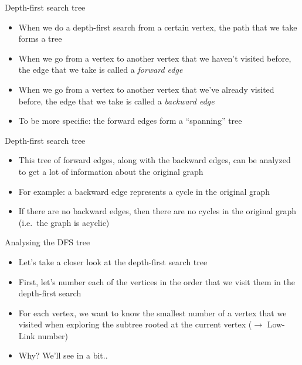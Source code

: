 \documentclass[12pt,t]{beamer}
\newcommand{\bi}{\begin{itemize}}
\newcommand{\ei}{\end{itemize}}
\begin{document}
\begin{frame}{Depth-first search tree}
    \vspace{30pt}

    \bi
        \item When we do a depth-first search from a certain vertex, the path
            that we take forms a tree
        \item When we go from a vertex to another vertex that we haven't visited before, the edge that we take is called a \textit{forward edge}
        \item When we go from a vertex to another vertex that we've already visited before, the edge that we take is called a \textit{backward edge}
        \item To be more specific: the forward edges form a ``spanning'' tree
    \ei
\end{frame}

\begin{frame}{Depth-first search tree}
    \vspace{30pt}

    \bi
        \item This tree of forward edges, along with the backward edges, can be analyzed to get a lot of information about the original graph
        \vspace{10pt}
        \item For example: a backward edge represents a cycle in the original graph
        \item If there are no backward edges, then there are no cycles in the original graph (i.e.\ the graph is acyclic)
    \ei
\end{frame}

\begin{frame}{Analysing the DFS tree}
    \vspace{20pt}
    \bi
        \item Let's take a closer look at the depth-first search tree
        \vspace{10pt}
        \item First, let's number each of the vertices in the order that we visit them in the depth-first search
        \item For each vertex, we want to know the smallest number of a vertex that we visited when exploring the subtree rooted at the current vertex ($\rightarrow$ Low-Link number)
        \vspace{10pt}
        \item Why? We'll see in a bit..
    \ei
\end{frame}
\end{document}
